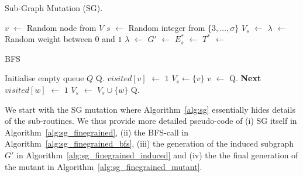 \documentclass[twoside]{article}
\begin{document}
\begin{algorithm}[H]
\caption{Sub-Graph Mutation (SG).}
\label{alg:sg_finegrained}
\begin{algorithmic}[1]   
    \State $v$ $\gets$ Random node from $V$
    \State $s$ $\gets$ Random integer from $\{3, \ldots, \sigma\}$
    \State $V_s$ $\gets$  
    \State $\lambda$ $\gets$ Random weight between $0$ and $1$
        \State $\lambda$ $\gets$  
    \EndIf
    \State $G'$ $\gets$  
    \State $E_s^{*}$ $\gets$  
    \State $T^{*}$ $\gets$  
    \State {}
\end{algorithmic}
\end{algorithm}

\begin{algorithm}[H]
\caption{BFS}
\label{alg:sg_finegrained_bfs}
\begin{algorithmic}[1] 
\State Initialise empty queue $Q$
\State Q.
\State $visited[v]$ $\gets$ $1$
\State $V_s \gets \{v\}$ 
    \State $v$ $\gets$ Q.
     
            \State \textbf{Next}
        \EndIf
            \State $visited[w]$ $\gets$ $1$
            \State $V_s$ $\gets$ $V_s \cup \{w\}$
                \State {} 
            \EndIf
            \State Q.
    \EndFor
\EndWhile
\end{algorithmic}
\end{algorithm}

We start with the SG mutation where Algorithm~\ref{alg:sg} essentially hides details of the sub-routines. We thus provide more detailed pseudo-code of (i) SG itself in Algorithm~\ref{alg:sg_finegrained}, (ii) the BFS-call in Algorithm~\ref{alg:sg_finegrained_bfs}, (iii) the generation of the induced subgraph $G'$ in Algorithm~\ref{alg:sg_finegrained_induced} and (iv) the the final generation of the mutant in Algorithm~\ref{alg:sg_finegrained_mutant}.
\end{document}
